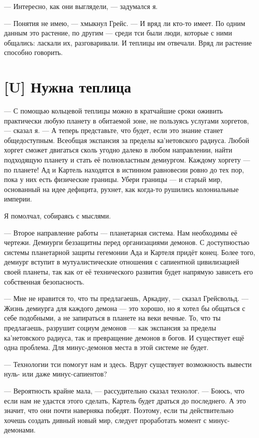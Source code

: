--- Интересно, как они выглядели, --- задумался я.

--- Понятия не имею, --- хмыкнул Грейс.
--- И вряд ли кто-то имеет.
По одним данным это растение, по другим --- среди тси были люди, которые с ними общались: ласкали их, разговаривали.
И теплицы им отвечали.
Вряд ли растение способно говорить.

\textspace

\section{[U] Нужна теплица}

\textspace

--- С помощью кольцевой теплицы можно в кратчайшие сроки оживить практически любую планету в обитаемой зоне, не пользуясь услугами хоргетов, --- сказал я.
--- А теперь представьте, что будет, если это знание станет общедоступным.
Всеобщая экспансия за пределы ка'нетовского радиуса.
Любой хоргет сможет двигаться сколь угодно далеко в любом направлении, найти подходящую планету и стать её полновластным демиургом.
Каждому хоргету --- по планете!
Ад и Картель находятся в истинном равновесии ровно до тех пор, пока у них есть физические границы.
Убери границы --- и старый мир, основанный на идее дефицита, рухнет, как когда-то рушились колониальные империи.

Я помолчал, собираясь с мыслями.

--- Второе направление работы --- планетарная система.
Нам необходимы её чертежи.
Демиурги беззащитны перед организациями демонов.
С доступностью системы планетарной защиты гегемонии Ада и Картеля придёт конец.
Более того, демиург вступит в мутуалистические отношения с сапиентной цивилизацией своей планеты, так как от её технического развития будет напрямую зависеть его собственная безопасность.

--- Мне не нравится то, что ты предлагаешь, Аркадиу, --- сказал Грейсвольд.
--- Жизнь демиурга для каждого демона --- это хорошо, но я хотел бы общаться с себе подобными, а не запираться в планете на веки вечные.
То, что ты предлагаешь, разрушит социум демонов --- как экспансия за пределы ка'нетовского радиуса, так и превращение демонов в богов.
И существует ещё одна проблема.
Для минус-демонов места в этой системе не будет.

--- Технологии тси помогут нам и здесь.
Вдруг существует возможность вывести нуль- или даже минус-сапиентов?

--- Вероятность крайне мала, --- рассудительно сказал технолог.
--- Боюсь, что если нам не удастся этого сделать, Картель будет драться до последнего.
А это значит, что они почти наверняка победят.
Поэтому, если ты действительно хочешь создать дивный новый мир, следует проработать момент с минус-демонами.

